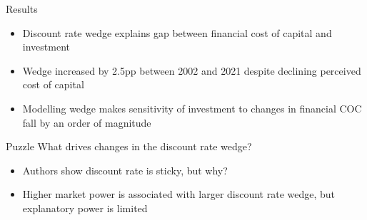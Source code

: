 \documentclass[aspectratio=169]{beamer}
\begin{document}
\begin{frame}{Results}

\footnotesize
\begin{itemize}
    \item Discount rate wedge explains gap between financial cost of capital and investment
    \item Wedge increased by 2.5pp between 2002 and 2021 despite declining perceived cost of capital
    \item Modelling wedge makes sensitivity of investment to changes in financial COC fall by an order of magnitude
\end{itemize}

\begin{alertblock}{Puzzle}
    What drives changes in the discount rate wedge?
\end{alertblock}

\begin{itemize}
    \item Authors show discount rate is sticky, but why?
    \item Higher market power is associated with larger discount rate wedge, but explanatory power is limited
\end{itemize}
\end{frame}

\end{document}

